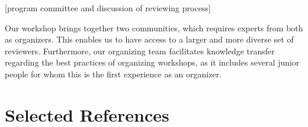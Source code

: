 \documentclass{article}
\begin{document}
[program committee and discussion of reviewing process]

    Our workshop brings together two communities, which requires experts from both as organizers. This enables us to have access to a larger and more diverse set of reviewers. Furthermore, our organizing team facilitates knowledge transfer regarding the best practices of organizing workshops, as it includes several junior people for whom this is the first experience as an organizer. 

\section{Selected References}




\nocite{liuLargeLanguageModels2024}








\end{document}
